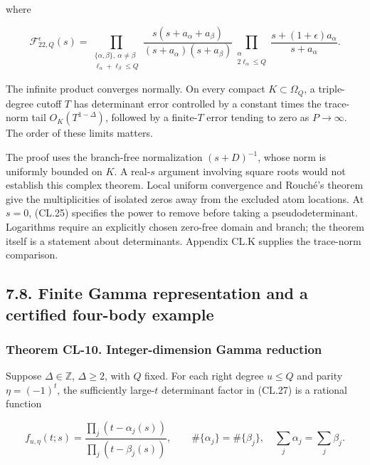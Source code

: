 where

\[
\mathcal F_{22,Q}^\epsilon(s)=
\prod_{\substack{\{\alpha,\beta\},\ \alpha\ne\beta\\
\ell_\alpha+\ell_\beta\leq Q}}
\frac{s(s+a_\alpha+a_\beta)}{(s+a_\alpha)(s+a_\beta)}
\prod_{\substack{\alpha\\2\ell_\alpha\leq Q}}
\frac{s+(1+\epsilon)a_\alpha}{s+a_\alpha}.
\tag{CL.28}
\]

The infinite product converges normally. On every compact \(K\subset\Omega_Q\), a triple-degree cutoff \(T\) has determinant error controlled by a constant times the trace-norm tail \(O_K(T^{1-\Delta})\), followed by a finite-\(T\) error tending to zero as \(P\to\infty\). The order of these limits matters.

The proof uses the branch-free normalization \((s+D)^{-1}\), whose norm is uniformly bounded on \(K\). A real-\(s\) argument involving square roots would not establish this complex theorem. Local uniform convergence and Rouché's theorem give the multiplicities of isolated zeros away from the excluded atom locations. At \(s=0\), (CL.25) specifies the power to remove before taking a pseudodeterminant. Logarithms require an explicitly chosen zero-free domain and branch; the theorem itself is a statement about determinants. Appendix CL.K supplies the trace-norm comparison.

\hypertarget{finite-gamma-representation-and-a-certified-four-body-example}{%
\subsection{7.8. Finite Gamma representation and a certified four-body example}\label{finite-gamma-representation-and-a-certified-four-body-example}}

\hypertarget{theorem-cl-10.-integer-dimension-gamma-reduction}{%
\subsubsection{Theorem CL-10. Integer-dimension Gamma reduction}\label{theorem-cl-10.-integer-dimension-gamma-reduction}}

Suppose \(\Delta\in\mathbb Z\), \(\Delta\geq2\), with \(Q\) fixed. For each right degree \(u\leq Q\) and parity \(\eta=(-1)^t\), the sufficiently large-\(t\) determinant factor in (CL.27) is a rational function

\[
f_{u,\eta}(t;s)=
\frac{\prod_j(t-\alpha_j(s))}{\prod_j(t-\beta_j(s))},
\qquad
\#\{\alpha_j\}=\#\{\beta_j\},\quad
\sum_j\alpha_j=\sum_j\beta_j.
\tag{CL.29}
\]

